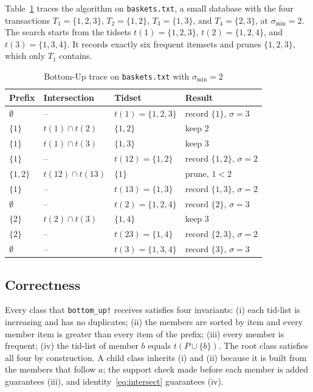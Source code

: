 Table~\ref{tab:trace} traces the algorithm on \texttt{baskets.txt}, a small database with
the four transactions $T_1 = \{1,2,3\}$, $T_2 = \{1,2\}$, $T_3 = \{1,3\}$, and
$T_4 = \{2,3\}$, at $\sigma_{\min} = 2$. The search starts from the tidsets
$t(1) = \{1,2,3\}$, $t(2) = \{1,2,4\}$, and $t(3) = \{1,3,4\}$. It records exactly six
frequent itemsets and prunes $\{1,2,3\}$, which only $T_1$ contains.

\begin{table}[t]
\centering
\caption{Bottom-Up trace on \texttt{baskets.txt} with $\sigma_{\min} = 2$}
\label{tab:trace}
\begin{tabular}{llll}
\hline
Prefix & Intersection & Tidset & Result \\
\hline
$\emptyset$ & -- & $t(1) = \{1,2,3\}$ & record $\{1\}$, $\sigma = 3$ \\
$\{1\}$ & $t(1) \cap t(2)$ & $\{1,2\}$ & keep $2$ \\
$\{1\}$ & $t(1) \cap t(3)$ & $\{1,3\}$ & keep $3$ \\
$\{1\}$ & -- & $t(12) = \{1,2\}$ & record $\{1,2\}$, $\sigma = 2$ \\
$\{1,2\}$ & $t(12) \cap t(13)$ & $\{1\}$ & prune, $1 < 2$ \\
$\{1\}$ & -- & $t(13) = \{1,3\}$ & record $\{1,3\}$, $\sigma = 2$ \\
$\emptyset$ & -- & $t(2) = \{1,2,4\}$ & record $\{2\}$, $\sigma = 3$ \\
$\{2\}$ & $t(2) \cap t(3)$ & $\{1,4\}$ & keep $3$ \\
$\{2\}$ & -- & $t(23) = \{1,4\}$ & record $\{2,3\}$, $\sigma = 2$ \\
$\emptyset$ & -- & $t(3) = \{1,3,4\}$ & record $\{3\}$, $\sigma = 3$ \\
\hline
\end{tabular}
\end{table}

\subsection{Correctness}
\label{sec:correctness}
Every class that \texttt{bottom\_up!} receives satisfies four invariants: (i) each
tid-list is increasing and has no duplicates; (ii) the members are sorted by item and
every member item is greater than every item of the prefix; (iii) every member is
frequent; (iv) the tid-list of member $b$ equals $t(P \cup \{b\})$. The root class
satisfies all four by construction. A child class inherits (i) and (ii) because it is
built from the members that follow $a$; the support check made before each member is
added guarantees (iii), and identity~\eqref{eq:intersect} guarantees (iv).

